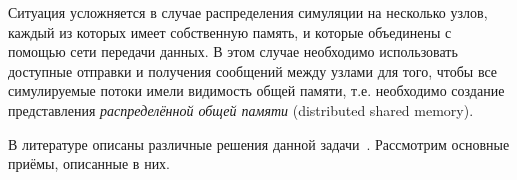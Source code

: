 Ситуация усложняется в случае распределения симуляции на несколько узлов, каждый из которых имеет собственную память, и которые объединены с помощью сети передачи данных. В этом случае необходимо использовать доступные отправки и получения сообщений между узлами для того, чтобы все симулируемые потоки имели видимость общей памяти, т.е. необходимо создание представления \textit{распределённой общей памяти} (\abbr distributed shared memory).

В литературе описаны различные решения данной задачи~\cite{Bugnion97disco:running, graphite2010}. Рассмотрим основные приёмы, описанные в них.

% 	
% 	
% 	
% 

